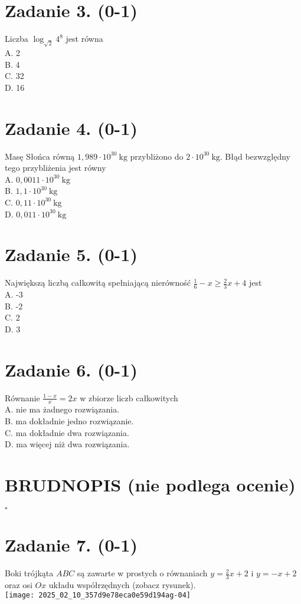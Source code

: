 \documentclass[10pt]{article}
\begin{document}
\section*{Zadanie 3. (0-1)}
Liczba \(\log _{\sqrt{2}} 4^{8}\) jest równa\\
A. 2\\
B. 4\\
C. 32\\
D. 16

\section*{Zadanie 4. (0-1)}
Masę Słońca równą \(1,989 \cdot 10^{30} \mathrm{~kg}\) przybliżono do \(2 \cdot 10^{30} \mathrm{~kg}\). Błąd bezwzględny tego przybliżenia jest równy\\
A. \(0,0011 \cdot 10^{30} \mathrm{~kg}\)\\
B. \(1,1 \cdot 10^{30} \mathrm{~kg}\)\\
C. \(0,11 \cdot 10^{30} \mathrm{~kg}\)\\
D. \(0,011 \cdot 10^{30} \mathrm{~kg}\)

\section*{Zadanie 5. (0-1)}
Największą liczbą całkowitą spełniającą nierówność \(\frac{1}{6}-x \geq \frac{2}{3} x+4\) jest\\
A. -3\\
B. -2\\
C. 2\\
D. 3

\section*{Zadanie 6. (0-1)}
Równanie \(\frac{1-x}{x}=2 x\) w zbiorze liczb całkowitych\\
A. nie ma żadnego rozwiązania.\\
B. ma dokładnie jedno rozwiązanie.\\
C. ma dokładnie dwa rozwiązania.\\
D. ma więcej niż dwa rozwiązania.

\section*{BRUDNOPIS (nie podlega ocenie)}
\(\square\)

\section*{Zadanie 7. (0-1)}
Boki trójkąta \(A B C\) są zawarte w prostych o równaniach \(y=\frac{2}{3} x+2\) i \(y=-x+2\) oraz osi \(O x\) układu współrzędnych (zobacz rysunek).\\
\texttt{[image: 2025\_02\_10\_357d9e78eca0e59d194ag-04]}
\end{document}
